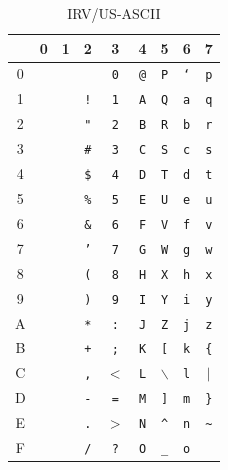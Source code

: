 \documentclass[a4j,10pt,fleqn,uplatex]{jsarticle}
\begin{document}
\begin{table}[htp]
\begin{center}\begin{tabular}{|c||c|c|c|c|c|c|c|c|}
    \hline
       & 0 & 1  & 2          & 3          & 4             & 5          & 6             & 7 \\ \hline \hline
    0  & ~ & ~  &            & \texttt{0} & \texttt{@}    & \texttt{P} & \texttt{`}    & \texttt{p} \\ \hline
    1  & ~ & ~  & \texttt{!} & \texttt{1} & \texttt{A}    & \texttt{Q} & \texttt{a}    & \texttt{q} \\ \hline
    2  & ~ & ~  & \texttt{"} & \texttt{2} & \texttt{B}    & \texttt{R} & \texttt{b}    & \texttt{r} \\ \hline
    3  & ~ & ~ & \texttt{\#} & \texttt{3} & \texttt{C}    & \texttt{S} & \texttt{c}    & \texttt{s} \\ \hline
    4  & ~ & ~ & \texttt{\$} & \texttt{4} & \texttt{D}    & \texttt{T} & \texttt{d}    & \texttt{t} \\ \hline
    5  & ~ & ~ & \texttt{\%} & \texttt{5} & \texttt{E}    & \texttt{U} & \texttt{e}    & \texttt{u} \\ \hline
    6  & ~ & ~ & \texttt{\&} & \texttt{6} & \texttt{F}    & \texttt{V} & \texttt{f}    & \texttt{v} \\ \hline
    7  & ~ & ~  & \texttt{'} & \texttt{7} & \texttt{G}    & \texttt{W} & \texttt{g}    & \texttt{w} \\ \hline
    8  & ~ & ~  & \texttt{(} & \texttt{8} & \texttt{H}    & \texttt{X} & \texttt{h}    & \texttt{x} \\ \hline
    9  & ~ & ~  & \texttt{)} & \texttt{9} & \texttt{I}    & \texttt{Y} & \texttt{i}    & \texttt{y} \\ \hline
    A  & ~ & ~  & \texttt{*} & \texttt{:} & \texttt{J}    & \texttt{Z} & \texttt{j}    & \texttt{z} \\ \hline
    B  & ~ & ~  & \texttt{+} & \texttt{;} & \texttt{K}    & \texttt{[} & \texttt{k}   & \texttt{\{} \\ \hline
    C  & ~ & ~  & \texttt{,}        & $<$ & \texttt{L}  & $\backslash$ & \texttt{l}         &   $|$ \\ \hline
    D  & ~ & ~  & \texttt{-} & \texttt{=} & \texttt{M}    & \texttt{]} & \texttt{m}   & \texttt{\}} \\ \hline
    E  & ~ & ~  & \texttt{.}        & $>$ & \texttt{N} & \texttt{\^{}} & \texttt{n} & \texttt{\~{}} \\ \hline
    F  & ~ & ~  & \texttt{/} & \texttt{?} & \texttt{O}   & \texttt{\_} & \texttt{o}             &   \\ \hline
\end{tabular}\end{center}
\caption{IRV/US-ASCII} \label{tbl:US-ASCII}
\end{table}
\end{document}

